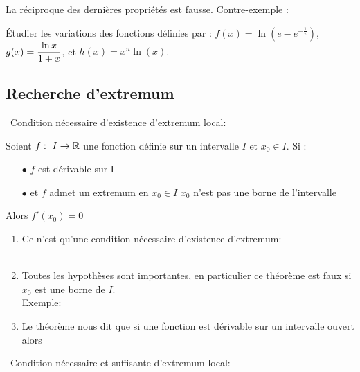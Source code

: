 \documentclass[a4paper, 11pt]{article}
\begin{document}
\begin{rem}
	\noindent \warning  La r\'eciproque des derni\`eres propri\'et\'es est fausse. Contre-exemple : \dotfill
\end{rem}

{\footnotesize
\begin{exercice}
	\'Etudier les variations des fonctions d\'efinies par : $f(x) = \ln{(e-e^{-\frac{1}{x}})}$, $g(x) = \displaystyle\frac{\ln{x}}{1+x}$, et $h(x)= x^n\ln{(x)}$.
\end{exercice}}


\subsection{Recherche d'extremum}

\noindent\ {Condition n\'ecessaire d'existence d'extremum local:}\\

{\noindent

\begin{prop}
	Soient $f:\ I\rightarrow \mathbb{R}$ une fonction d\'efinie sur un intervalle $I$ et $x_0\in I$. Si : \vsec
	\begin{itemize}
		\item[$\bullet$] $f$ est dérivable sur I
		\item[$\bullet$] et $f$ admet un extremum en $x_0 \in I$  $x_0$ n'est pas une borne de l'intervalle
	\end{itemize}
	Alors $f'(x_0) =0$
\end{prop}
}

\begin{rems}
	\begin{enumerate}
		\item \noindent \warning  Ce n'est qu'une condition n\'ecessaire d'existence d'extremum:\dotfill \\
		      \dotfill \\
		\item Toutes les hypoth\`eses sont importantes, en particulier ce th\'eor\`eme est faux si $x_0$ est une borne de $I$.\\
		      Exemple: \dotfill
		\item Le th\'eor\`eme nous dit que si une fonction est d\'erivable sur un intervalle ouvert alors \\
		      \dotfill
	\end{enumerate}
\end{rems}

\vspace{0.4cm}
\noindent\ {Condition n\'ecessaire et suffisante d'extremum local:}\\
\end{document}
